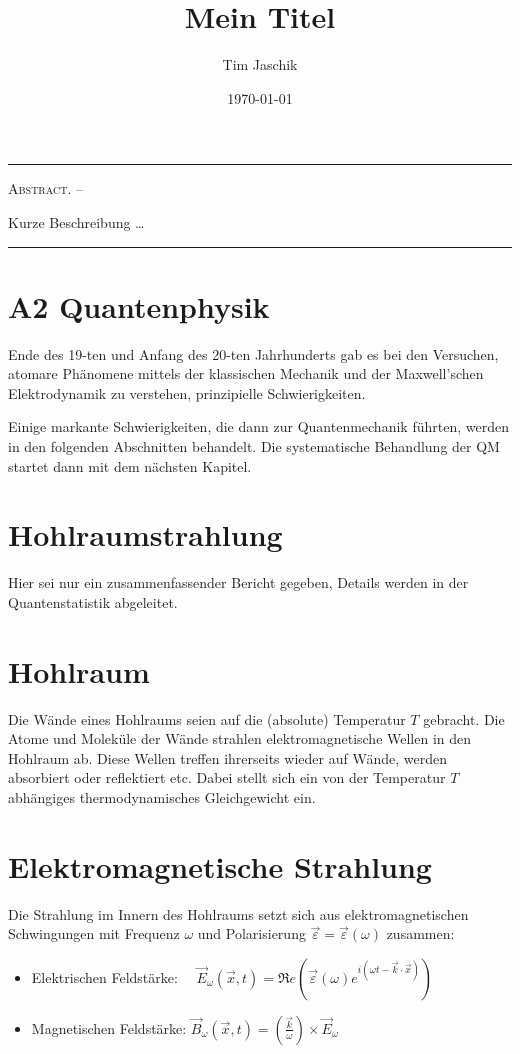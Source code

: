 \documentclass[10pt, letterpaper]{article}
\title{Mein Titel}
\author{Tim Jaschik}
\date{\today}
\renewenvironment{abstract}
  {
    \begin{adjustwidth}{1.5cm}{1.5cm}
    \small
    \textsc{Abstract. –}%
  }
  {
    \end{adjustwidth}
  }
\begin{document}
\maketitle
\rule{\textwidth}{0.5pt}
\begin{abstract}
Kurze Beschreibung …
\end{abstract}
\rule{\textwidth}{0.5pt}
\vspace{0.5cm}

\tableofcontents

\pagebreak



\section*{A2 Quantenphysik}
Ende des 19-ten und Anfang des 20-ten Jahrhunderts gab es bei den Versuchen, atomare Phänomene mittels der klassischen Mechanik und der Maxwell'schen Elektrodynamik zu verstehen, prinzipielle Schwierigkeiten.

Einige markante Schwierigkeiten, die dann zur Quantenmechanik führten, werden in den folgenden Abschnitten behandelt. Die systematische Behandlung der QM startet dann mit dem nächsten Kapitel.

\section*{Hohlraumstrahlung}
Hier sei nur ein zusammenfassender Bericht gegeben, Details werden in der Quantenstatistik abgeleitet.

\section*{Hohlraum}
Die Wände eines Hohlraums seien auf die (absolute) Temperatur $T$ gebracht. Die Atome und Moleküle der Wände strahlen elektromagnetische Wellen in den Hohlraum ab. Diese Wellen treffen ihrerseits wieder auf Wände, werden absorbiert oder reflektiert etc. Dabei stellt sich ein von der Temperatur $T$ abhängiges thermodynamisches Gleichgewicht ein.

\section*{Elektromagnetische Strahlung}
Die Strahlung im Innern des Hohlraums setzt sich aus elektromagnetischen Schwingungen mit Frequenz $\omega$ und Polarisierung $\vec{\varepsilon}=\vec{\varepsilon}(\omega)$ zusammen:

\begin{itemize}
  \item Elektrischen Feldstärke: $\quad \vec{E}_{\omega}(\vec{x}, t)=\Re e\left(\vec{\varepsilon}(\omega) e^{i(\omega t-\vec{k} \cdot \vec{x})}\right)$
  \item Magnetischen Feldstärke: $\vec{B}_{\omega}(\vec{x}, t)=\left(\frac{\vec{k}}{\omega}\right) \times \vec{E}_{\omega}$
\end{itemize}
\end{document}
